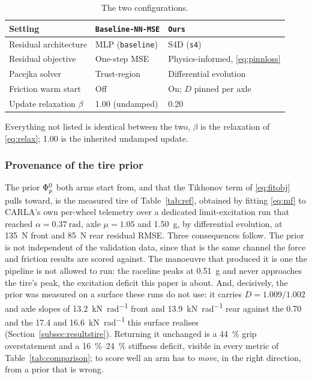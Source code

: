\begin{table}[t]
\caption{The two configurations.}
\label{tab:scenarios}
\centering
\begin{threeparttable}
\footnotesize
\setlength{\tabcolsep}{4pt}
\begin{tabular}{@{}lll@{}}
\toprule
Setting & \texttt{Baseline-NN-MSE} & \texttt{Ours}\\
\midrule
Residual architecture & MLP (\texttt{baseline}) & S4D (\texttt{s4})\\
Residual objective & One-step MSE & Physics-informed,
\eqref{eq:pinnloss}\\
Pacejka solver & Trust-region~\cite{branch1999trust} & Differential
evolution~\cite{storn1997de}\\
Friction warm start & Off & On; $D$ pinned per axle\\
Update relaxation $\beta$ & \num{1.00} (undamped) & \num{0.20}\\
\bottomrule
\end{tabular}
\begin{tablenotes}[flushleft]\scriptsize
\item Everything not listed is identical between the two,
$\beta$ is the relaxation of \eqref{eq:relax}; \num{1.00} is the inherited
undamped update.
\end{tablenotes}
\end{threeparttable}
\end{table}

\subsubsection{Provenance of the tire prior}
\label{subsubsec:priorprovenance}
The prior $\Phi_{p}^{0}$ both arms start from, and that the Tikhonov term of
\eqref{eq:fitobj} pulls toward, is the measured tire of Table~\ref{tab:ref},
obtained by fitting \eqref{eq:mf} to CARLA's own per-wheel telemetry over a
dedicated limit-excitation run that reached $\alpha=\SI{0.37}{\radian}$, axle
$\mu=\num{1.05}$ and \SI{1.50}{\g}, by differential evolution, at
\SI{135}{\newton} front and \SI{85}{\newton} rear residual RMSE. Three
consequences follow. The prior is not independent of the validation data, since
that is the same channel the force and friction results are scored against. The
manoeuvre that produced it is one the pipeline is not allowed to run: the
raceline peaks at \SI{0.51}{\g} and never approaches the tire's peak, the
excitation deficit this paper is about. And, decisively, the prior was measured
on a surface these runs do not use: it carries $D=\num{1.009}/\num{1.002}$ and
axle slopes of \SI{13.2}{\kilo\newton\per\radian} front and
\SI{13.9}{\kilo\newton\per\radian} rear against the \num{0.70} and the
\num{17.4} and \SI{16.6}{\kilo\newton\per\radian} this surface realises
(Section~\ref{subsec:resultstire}). Returning it unchanged is a
\SI{44}{\percent} grip overstatement and a \SIrange{16}{24}{\percent} stiffness
deficit, visible in every metric of Table~\ref{tab:comparison}; to score well
an arm has to \emph{move}, in the right direction, from a prior that is wrong.

